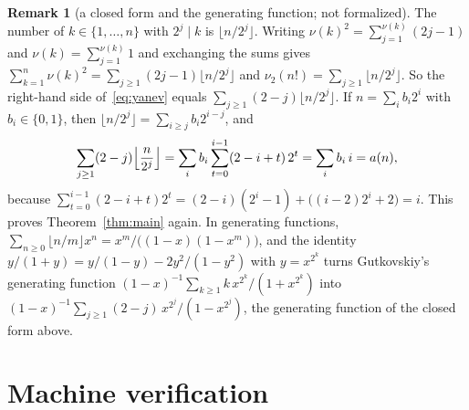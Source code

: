 \documentclass[11pt]{amsart}
\theoremstyle{plain}
\theoremstyle{definition}
\newtheorem{remark}[theorem]{Remark}
\newcommand{\vt}{\nu_2}
\begin{document}
\begin{remark}[a closed form and the generating function; not formalized]\label{rem:closed}
The number of $k\in\{1,\dots,n\}$ with $2^j\mid k$ is $\lfloor n/2^j\rfloor$. Writing $\nu(k)^2=\sum_{j=1}^{\nu(k)}(2j-1)$ and $\nu(k)=\sum_{j=1}^{\nu(k)}1$ and exchanging the sums gives $\sum_{k=1}^{n}\nu(k)^2=\sum_{j\ge1}(2j-1)\lfloor n/2^j\rfloor$ and $\vt(n!)=\sum_{j\ge1}\lfloor n/2^j\rfloor$. So the right-hand side of~\eqref{eq:yanev} equals $\sum_{j\ge1}(2-j)\lfloor n/2^j\rfloor$. If $n=\sum_i b_i2^i$ with $b_i\in\{0,1\}$, then $\lfloor n/2^j\rfloor=\sum_{i\ge j}b_i2^{i-j}$, and
\[
  \sum_{j\ge1}(2-j)\Bigl\lfloor\frac{n}{2^j}\Bigr\rfloor=\sum_{i}b_i\sum_{t=0}^{i-1}(2-i+t)\,2^t=\sum_i b_i\,i=a(n),
\]
because $\sum_{t=0}^{i-1}(2-i+t)2^t=(2-i)(2^i-1)+\bigl((i-2)2^i+2\bigr)=i$. This proves Theorem~\ref{thm:main} again. In generating functions, $\sum_{n\ge0}\lfloor n/m\rfloor x^n=x^m/\bigl((1-x)(1-x^m)\bigr)$, and the identity $y/(1+y)=y/(1-y)-2y^2/(1-y^2)$ with $y=x^{2^k}$ turns Gutkovskiy's generating function $(1-x)^{-1}\sum_{k\ge1}k\,x^{2^k}/(1+x^{2^k})$ into $(1-x)^{-1}\sum_{j\ge1}(2-j)\,x^{2^j}/(1-x^{2^j})$, the generating function of the closed form above.
\end{remark}

\section{Machine verification}\label{sec:lean}
\end{document}
